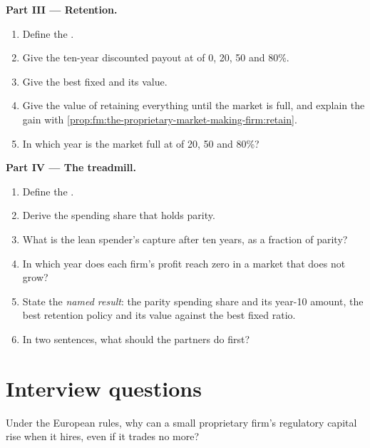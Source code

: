 \begin{problem}
\medskip\noindent\textbf{Part III --- Retention.}
\begin{enumerate}[resume]
\item Define the .
\item Give the ten-year discounted payout at  of 0, 20, 50 and 80\%.
\item Give the best fixed  and its value.
\item Give the value of retaining everything until the market is full, and explain the gain with \cref{prop:fm:the-proprietary-market-making-firm:retain}.
\item In which year is the market full at  of 20, 50 and 80\%?
\end{enumerate}

\medskip\noindent\textbf{Part IV --- The treadmill.}
\begin{enumerate}[resume]
\item Define the .
\item Derive the spending share that holds parity.
\item What is the lean spender's capture after ten years, as a fraction of parity?
\item In which year does each firm's profit reach zero in a market that does not grow?
\item State the \emph{named result}: the parity spending share and its year-10 amount, the best retention policy and its value against the best
fixed ratio.
\item In two sentences, what should the partners do first?
\end{enumerate}
\end{problem}

\section{Interview questions}

\begin{interviewq}\label{iq:fm:the-proprietary-market-making-firm:1}
Under the European rules, why can a small proprietary firm's regulatory capital rise when it hires, even if it trades no more?
\end{interviewq}


